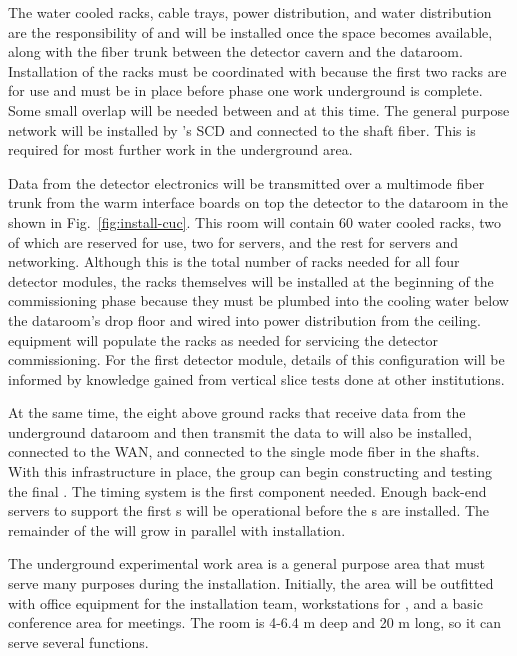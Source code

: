 The water cooled racks, cable trays, power distribution, and water distribution are the responsibility of  and will be installed once the space becomes available, along with the  fiber trunk between the detector cavern and the  dataroom. Installation of the racks must be coordinated with  because the first two racks are for  use and must be in place before phase one work underground is complete. Some small overlap will be needed between  and  at this time. The general purpose network will be installed by 's SCD  and connected to the shaft fiber. This is required for most further work in the underground area.

Data from the detector electronics will be transmitted over a multimode fiber trunk from the warm interface boards on top the detector to the  dataroom in the  shown in Fig.~\ref{fig:install-cuc}.  This room will contain 60 water cooled racks, two of which are reserved for  use, two for  servers, and the rest for  servers and networking. Although this is the total number of racks needed for all four detector modules, the racks themselves will be installed at the beginning of the  commissioning phase because they must be plumbed into the cooling water below the dataroom's drop floor and wired into power distribution from the ceiling.   equipment will populate the racks as needed for servicing the detector commissioning.  For the first detector module, details of this configuration will be informed by knowledge gained from  vertical slice tests done at other institutions.  

At the same time, the eight above ground  racks that receive data from the underground dataroom and then transmit the data to  will also be installed, connected to the WAN, and connected to the single mode fiber in the shafts. With this infrastructure in place, the  group can begin constructing and testing the final  .  The timing system is the first  component needed.  Enough  back-end servers to support the first s will be operational before the s are installed.  The remainder of the  will grow in parallel with  installation.

The underground experimental work area is a general purpose area that must serve many purposes during the  installation. Initially, the area will be outfitted with office equipment for the installation team, workstations for , and a basic conference area for meetings.  The room is 4-6.4 \si{m} deep and 20 \si{m} long, so it can serve several functions.

